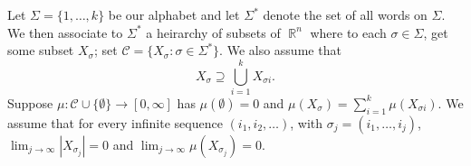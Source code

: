 \documentclass[11pt, a4paper]{memoir}
\makeatletter
\DeclareMathOperator{\R}{{\mathbb{R}}}
\providecommand*{\bigcupdot}{%
  \mathop{%
    \vphantom{\bigcup}%
    \mathpalette\@bigcupdot{}%
  }%
}
\newcommand*{\@bigcupdot}[2]{%
  \ooalign{%
    $\m@th#1\bigcup$\cr
    \sbox0{$#1\bigcup$}%
    \dimen@=\ht0 %
    \advance\dimen@ by -\dp0 %
    \sbox0{\scalebox{2}{$\m@th#1\cdot$}}%
    \advance\dimen@ by -\ht0 %
    \dimen@=.5\dimen@
    \hidewidth\raise\dimen@\box0\hidewidth
  }%
}
\theoremstyle{change}
\theoremstyle{plain}
\theoremstyle{nonumberplain}
\numberwithin{equation}{section}
\makeatother
\begin{document}
Let $\Sigma=\{1,\ldots,k\}$ be our alphabet and let $\Sigma^*$ denote the set of all words on $\Sigma$.
We then associate to $\Sigma^*$ a heirarchy of subsets of $\R^n$ where to each $\sigma\in\Sigma$, get some subset $X_\sigma$; set $\mathcal{C}=\{X_\sigma:\sigma\in\Sigma^*\}$.
We also assume that
\begin{equation*}
    X_\sigma\supseteq\bigcup_{i=1}^kX_{\sigma i}.
\end{equation*}
Suppose $\mu:\mathcal{C}\cup\{\emptyset\}\to[0,\infty]$ has $\mu(\emptyset)=0$ and $\mu(X_\sigma)=\sum_{i=1}^k\mu(X_{\sigma i})$.
We assume that for every infinite sequence $(i_1,i_2,\ldots)$, with $\sigma_j=(i_1,\ldots,i_j)$, $\lim_{j\to\infty}|X_{\sigma_j}|=0$ and $\lim_{j\to\infty}\mu(X_{\sigma_j})=0$.

\end{document}
